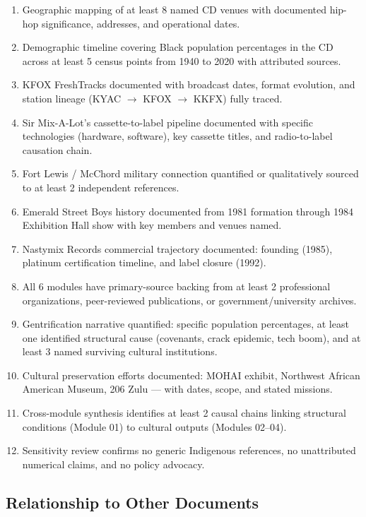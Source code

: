 \documentclass[11pt,letterpaper]{article}
\begin{document}
\begin{enumerate}
  \item Geographic mapping of at least 8 named CD venues with documented hip-hop significance, addresses, and operational dates.
  \item Demographic timeline covering Black population percentages in the CD across at least 5 census points from 1940 to 2020 with attributed sources.
  \item KFOX FreshTracks documented with broadcast dates, format evolution, and station lineage (KYAC $\rightarrow$ KFOX $\rightarrow$ KKFX) fully traced.
  \item Sir Mix-A-Lot's cassette-to-label pipeline documented with specific technologies (hardware, software), key cassette titles, and radio-to-label causation chain.
  \item Fort Lewis / McChord military connection quantified or qualitatively sourced to at least 2 independent references.
  \item Emerald Street Boys history documented from 1981 formation through 1984 Exhibition Hall show with key members and venues named.
  \item Nastymix Records commercial trajectory documented: founding (1985), platinum certification timeline, and label closure (1992).
  \item All 6 modules have primary-source backing from at least 2 professional organizations, peer-reviewed publications, or government/university archives.
  \item Gentrification narrative quantified: specific population percentages, at least one identified structural cause (covenants, crack epidemic, tech boom), and at least 3 named surviving cultural institutions.
  \item Cultural preservation efforts documented: MOHAI exhibit, Northwest African American Museum, 206 Zulu --- with dates, scope, and stated missions.
  \item Cross-module synthesis identifies at least 2 causal chains linking structural conditions (Module 01) to cultural outputs (Modules 02--04).
  \item Sensitivity review confirms no generic Indigenous references, no unattributed numerical claims, and no policy advocacy.
\end{enumerate}

\subsection{Relationship to Other Documents}
\end{document}
